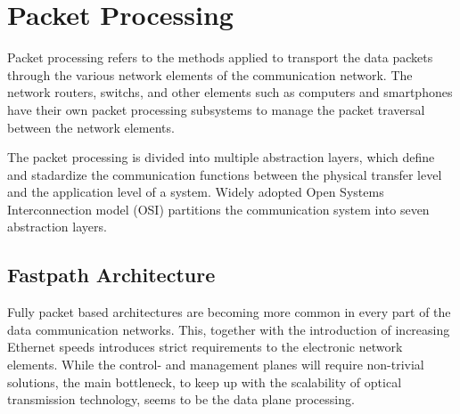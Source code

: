 


\section{Packet Processing}
\label{sec:packet-processing}

Packet processing refers to the methods applied to transport the data packets through the various network elements of the communication network. The network routers, switchs, and other elements such as computers and smartphones have their own packet processing subsystems to manage the packet traversal between the network elements.

The packet processing is divided into multiple abstraction layers, which define and stadardize the communication functions between the physical transfer level and the application level of a system. Widely adopted Open Systems Interconnection model (OSI) partitions the communication system into seven abstraction layers.



\subsection{Fastpath Architecture}
Fully packet based architectures are becoming more common in every part of the data communication networks. This, together with the introduction of increasing Ethernet speeds introduces strict requirements to the electronic network elements. While the control- and management planes will require non-trivial solutions, the main bottleneck, to keep up with the scalability of optical transmission technology, seems to be the data plane processing.~\cite{Hauger:2009:PP}

